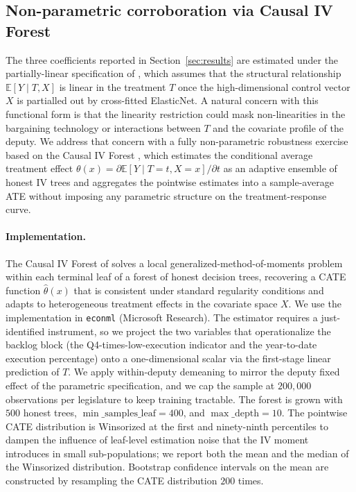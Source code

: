 \documentclass[pdflatex,sn-basic]{sn-jnl}
\begin{document}
\subsection{Non-parametric corroboration via Causal IV Forest}
\label{app:cforest}

The three coefficients reported in Section~\ref{sec:results} are estimated under the partially-linear specification of \citet{Chernozhukov2018}, which assumes that the structural relationship $\mathbb{E}[Y \mid T, X]$ is linear in the treatment $T$ once the high-dimensional control vector $X$ is partialled out by cross-fitted ElasticNet. A natural concern with this functional form is that the linearity restriction could mask non-linearities in the bargaining technology or interactions between $T$ and the covariate profile of the deputy. We address that concern with a fully non-parametric robustness exercise based on the Causal IV Forest \citep{AtheyTibshiraniWager2019}, which estimates the conditional average treatment effect $\theta(x) = \partial\mathbb{E}[Y \mid T = t, X = x] / \partial t$ as an adaptive ensemble of honest IV trees and aggregates the pointwise estimates into a sample-average ATE without imposing any parametric structure on the treatment-response curve.

\paragraph{Implementation.} The Causal IV Forest of \citet{AtheyTibshiraniWager2019} solves a local generalized-method-of-moments problem within each terminal leaf of a forest of honest decision trees, recovering a CATE function $\hat\theta(x)$ that is consistent under standard regularity conditions and adapts to heterogeneous treatment effects in the covariate space $X$. We use the implementation in \texttt{econml} (Microsoft Research). The estimator requires a just-identified instrument, so we project the two variables that operationalize the backlog block (the Q4-times-low-execution indicator and the year-to-date execution percentage) onto a one-dimensional scalar via the first-stage linear prediction of $T$. We apply within-deputy demeaning to mirror the deputy fixed effect of the parametric specification, and we cap the sample at $200{,}000$ observations per legislature to keep training tractable. The forest is grown with $500$ honest trees, $\min\_\mathrm{samples\_leaf} = 400$, and $\max\_\mathrm{depth} = 10$. The pointwise CATE distribution is Winsorized at the first and ninety-ninth percentiles to dampen the influence of leaf-level estimation noise that the IV moment introduces in small sub-populations; we report both the mean and the median of the Winsorized distribution. Bootstrap confidence intervals on the mean are constructed by resampling the CATE distribution $200$ times.
\end{document}
